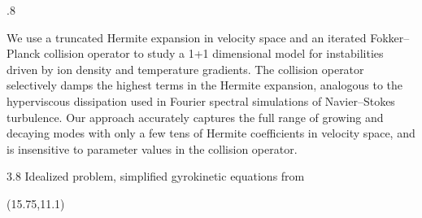 \documentclass[a0]{a0poster}
\begin{document}
\framethick
\begin{area1w}{.8}

\vspace{-10mm}
\vspace{-10mm}
{\large
We use a truncated Hermite expansion in velocity space and an iterated Fokker--Planck collision operator to study a 1+1 dimensional model for instabilities driven by ion density and temperature gradients. 
The collision operator selectively damps the highest terms in the Hermite expansion, analogous to the hyperviscous dissipation used in Fourier spectral simulations of Navier--Stokes turbulence. 
Our approach accurately captures the full range of growing and decaying modes with only a few tens of Hermite coefficients in velocity space, and is insensitive to parameter values in the collision operator. %
}
\end{area1w}

\TPMargin{10pt}

\framethin
\begin{area1}{3.8}
  Idealized problem, simplified gyrokinetic equations  from \cite{PDJ,Belli05}

\end{area1}




\frameoff
\begin{textblock}{15.5}(15.75,11.1)
\small{
\renewcommand{\refname}{}

\vspace{-3.8cm}
{\selectfont\sffamily 

}
}
\end{textblock}
\end{document}
